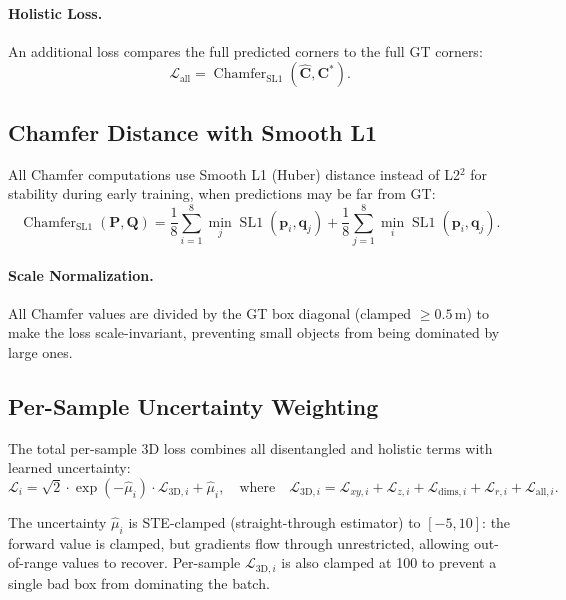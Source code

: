 \documentclass[runningheads]{llncs}
\newcommand{\op}[1]{\operatorname{#1}}
\newcommand{\mat}[1]{\bm{#1}}
\begin{document}
\paragraph{Holistic Loss.}  An additional loss compares the full predicted corners to the full GT corners:
\begin{equation}
    \mathcal{L}_{\text{all}} = \op{Chamfer}_{\text{SL1}}(\hat{\mat{C}}, \mat{C}^*).
    \label{eq:l_all}
\end{equation}

\subsection{Chamfer Distance with Smooth L1}

All Chamfer computations use Smooth L1 (Huber) distance instead of L2$^2$ for stability during early training, when predictions may be far from GT:
\begin{equation}
    \op{Chamfer}_{\text{SL1}}(\mat{P}, \mat{Q}) = \frac{1}{8}\sum_{i=1}^{8}\min_j \op{SL1}(\mat{p}_i, \mat{q}_j) + \frac{1}{8}\sum_{j=1}^{8}\min_i \op{SL1}(\mat{p}_i, \mat{q}_j).
    \label{eq:chamfer}
\end{equation}

\paragraph{Scale Normalization.}  All Chamfer values are divided by the GT box diagonal (clamped $\geq 0.5$\,m) to make the loss scale-invariant, preventing small objects from being dominated by large ones.

\subsection{Per-Sample Uncertainty Weighting}

The total per-sample 3D loss combines all disentangled and holistic terms with learned uncertainty:
\begin{equation}
    \mathcal{L}_i = \sqrt{2} \cdot \exp(-\hat{\mu}_i) \cdot \mathcal{L}_{\text{3D},i} + \hat{\mu}_i, \quad \text{where} \quad \mathcal{L}_{\text{3D},i} = \mathcal{L}_{xy,i} + \mathcal{L}_{z,i} + \mathcal{L}_{\text{dims},i} + \mathcal{L}_{r,i} + \mathcal{L}_{\text{all},i}.
    \label{eq:uncertainty}
\end{equation}

The uncertainty $\hat{\mu}_i$ is STE-clamped (straight-through estimator) to $[-5, 10]$: the forward value is clamped, but gradients flow through unrestricted, allowing out-of-range values to recover.  Per-sample $\mathcal{L}_{\text{3D},i}$ is also clamped at 100 to prevent a single bad box from dominating the batch.
\end{document}

